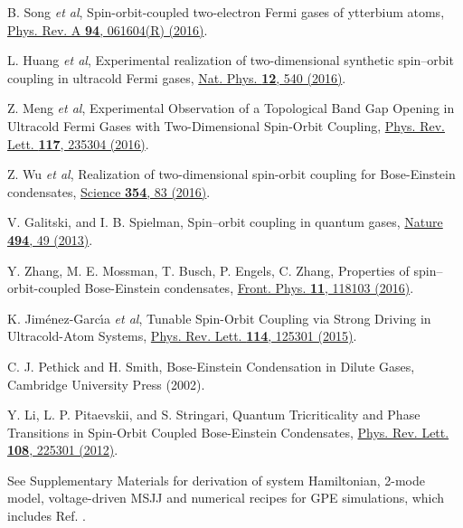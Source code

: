\documentclass[twocolumn,prl,floatfix,citeautoscript,nofootinbib,superscriptaddress]{revtex4}
\begin{document}
\begin{thebibliography}{99}
 B. Song \textit{et al}, {Spin-orbit-coupled two-electron Fermi
gases of ytterbium atoms}, \href{https://doi.org/10.1103/PhysRevA.94.061604}{%
Phys. Rev. A \textbf{94}, 061604(R) (2016)}.

 L. Huang \textit{et al}, {Experimental realization of
two-dimensional synthetic spin--orbit coupling in ultracold Fermi gases},
\href{https://doi.org/doi:10.1038/nphys3672}{Nat. Phys. \textbf{12}, 540
(2016)}.

 Z. Meng \textit{et al}, {Experimental Observation of a
Topological Band Gap Opening in Ultracold Fermi Gases with Two-Dimensional
Spin-Orbit Coupling}, \href{https://doi.org/10.1103/PhysRevLett.117.235304}{%
Phys. Rev. Lett. \textbf{117}, 235304 (2016)}.

 Z. Wu \textit{et al}, {Realization of two-dimensional
spin-orbit coupling for Bose-Einstein condensates}, \href{https://doi.org/10.1126/Science.aaf6689}%
{Science \textbf{354}, 83 (2016)}.


 V. Galitski, and I. B. Spielman, {Spin--orbit
coupling in quantum gases}, \href{https://doi.org/10.1038/nature11841}{%
Nature \textbf{494}, 49 (2013)}.

 Y. Zhang, M. E. Mossman, T. Busch, P. Engels, C. Zhang, {%
Properties of spin--orbit-coupled Bose-Einstein condensates}, \href{https://doi.org/10.1007/s11467-016-0560-y}%
{Front. Phys. \textbf{11}, 118103 (2016)}.


 K. Jim\'{e}nez-Garc\'{\i}a \textit{et al}, {Tunable
Spin-Orbit Coupling via Strong Driving in Ultracold-Atom Systems}, \href{https://doi.org/10.1103/PhysRevLett.114.125301}%
{Phys. Rev. Lett. \textbf{114}, 125301 (2015)}.


 C. J. Pethick and H. Smith, Bose-Einstein Condensation in
Dilute Gases, Cambridge University Press (2002).


 Y. Li, L. P. Pitaevskii, and S. Stringari, {Quantum
Tricriticality and Phase Transitions in Spin-Orbit Coupled Bose-Einstein
Condensates}, \href{https://doi.org/10.1103/PhysRevLett.108.225301}{Phys.
Rev. Lett. \textbf{108}, 225301 (2012)}.


 See Supplementary Materials for derivation of system
Hamiltonian, 2-mode model, voltage-driven MSJJ and numerical recipes for GPE
simulations, which includes Ref. \cite{Bao2003}.


\end{thebibliography}
\end{document}
